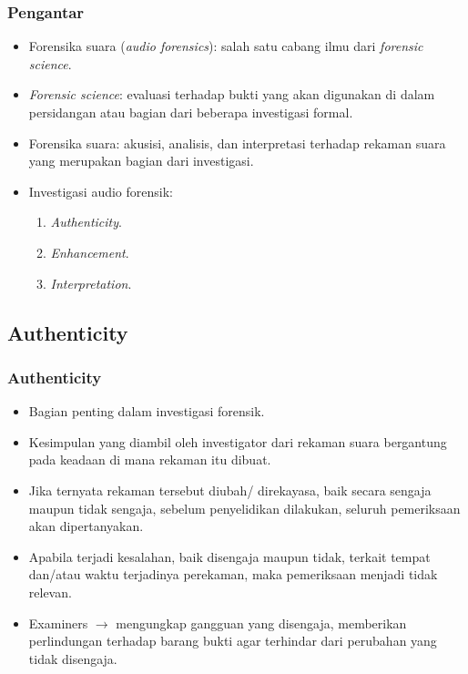 \documentclass[pdflatex,compress]{beamer}
\begin{document}
\begin{frame}
	\frametitle{Pengantar}
	\begin{itemize}
		\item Forensika suara (\textit{audio forensics}): salah satu cabang ilmu dari \textit{forensic science}.
		\item \textit{Forensic science}: evaluasi terhadap bukti yang akan digunakan di dalam persidangan atau bagian dari beberapa investigasi formal.
		\item Forensika suara: akusisi, analisis, dan interpretasi terhadap rekaman suara yang merupakan bagian dari investigasi.
		\item Investigasi audio forensik:
		\begin{enumerate}
			\item \textit{Authenticity}.
			\item \textit{Enhancement}.
			\item \textit{Interpretation}.
		\end{enumerate}
	\end{itemize}
\end{frame}

\subsection{Authenticity}

\begin{frame}
	\frametitle{Authenticity}
	\begin{itemize}
		\item Bagian penting dalam investigasi forensik.
		\item Kesimpulan yang diambil oleh investigator dari rekaman suara bergantung pada keadaan di mana rekaman itu dibuat.
		\item Jika ternyata rekaman tersebut diubah/ direkayasa, baik secara sengaja maupun tidak sengaja, sebelum penyelidikan dilakukan, seluruh pemeriksaan akan dipertanyakan.
		\item Apabila terjadi kesalahan, baik disengaja maupun tidak, terkait tempat dan/atau waktu terjadinya perekaman, maka pemeriksaan menjadi tidak relevan.
		\item Examiners $\rightarrow$ mengungkap gangguan yang disengaja, memberikan perlindungan terhadap barang bukti agar terhindar dari perubahan yang tidak disengaja.
	\end{itemize}
\end{frame}
\end{document}
